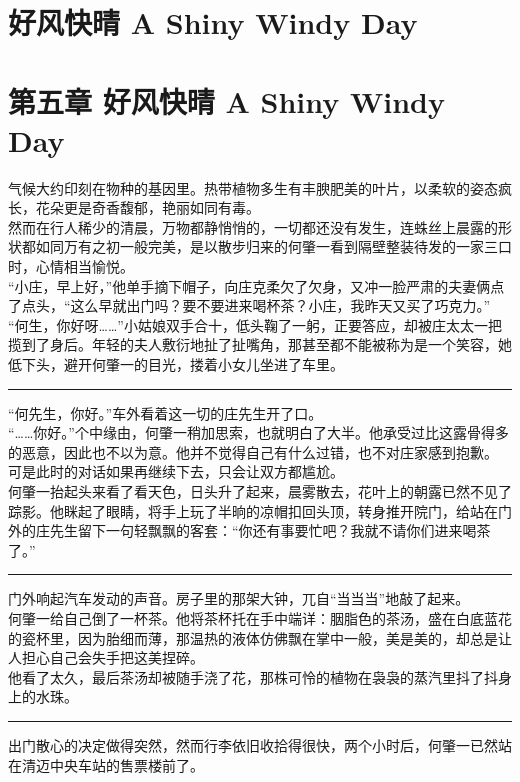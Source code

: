 \documentclass[oneside,11pt]{memoir} %
\begin{document}
\begin{CJK}{UTF8}{gbsn}
\newpage
\chapter{好风快晴    A Shiny Windy Day}
\newpage
\chapter*{第五章    好风快晴    A Shiny Windy Day}
   气候大约印刻在物种的基因里。热带植物多生有丰腴肥美的叶片，以柔软的姿态疯长，花朵更是奇香馥郁，艳丽如同有毒。\\\indent
    然而在行人稀少的清晨，万物都静悄悄的，一切都还没有发生，连蛛丝上晨露的形状都如同万有之初一般完美，是以散步归来的何肇一看到隔壁整装待发的一家三口时，心情相当愉悦。\\\indent
    “小庄，早上好，”他单手摘下帽子，向庄克柔欠了欠身，又冲一脸严肃的夫妻俩点了点头，“这么早就出门吗？要不要进来喝杯茶？小庄，我昨天又买了巧克力。”\\\indent
    “何生，你好呀……”小姑娘双手合十，低头鞠了一躬，正要答应，却被庄太太一把揽到了身后。年轻的夫人敷衍地扯了扯嘴角，那甚至都不能被称为是一个笑容，她低下头，避开何肇一的目光，搂着小女儿坐进了车里。\\\indent
\rule{-3pt}{30pt}
    “何先生，你好。”车外看着这一切的庄先生开了口。\\\indent
    “……你好。”个中缘由，何肇一稍加思索，也就明白了大半。他承受过比这露骨得多的恶意，因此也不以为意。他并不觉得自己有什么过错，也不对庄家感到抱歉。\\\indent
    可是此时的对话如果再继续下去，只会让双方都尴尬。\\\indent
    何肇一抬起头来看了看天色，日头升了起来，晨雾散去，花叶上的朝露已然不见了踪影。他眯起了眼睛，将手上玩了半晌的凉帽扣回头顶，转身推开院门，给站在门外的庄先生留下一句轻飘飘的客套：“你还有事要忙吧？我就不请你们进来喝茶了。”\\\indent
\rule{-3pt}{30pt}
    门外响起汽车发动的声音。房子里的那架大钟，兀自“当当当”地敲了起来。\\\indent
    何肇一给自己倒了一杯茶。他将茶杯托在手中端详：胭脂色的茶汤，盛在白底蓝花的瓷杯里，因为胎细而薄，那温热的液体仿佛飘在掌中一般，美是美的，却总是让人担心自己会失手把这美捏碎。\\\indent
    他看了太久，最后茶汤却被随手浇了花，那株可怜的植物在袅袅的蒸汽里抖了抖身上的水珠。\\\indent
\rule{-3pt}{30pt}
    出门散心的决定做得突然，然而行李依旧收拾得很快，两个小时后，何肇一已然站在清迈中央车站的售票楼前了。\\\indent

\end{CJK}
\end{document}
